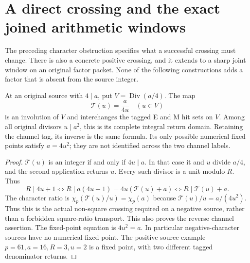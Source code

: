 \section{A direct crossing and the exact joined arithmetic windows}\label{sec:windows}
The preceding character obstruction specifies what a successful crossing must
change. There is also a concrete positive crossing, and it extends to a sharp
joint window on an original factor packet. None of the following constructions
adds a factor that is absent from the source integer.

\begin{theorem}\label{thm:quarter}
At an original source with $4\mid a$, put $V=\operatorname{Div}(a/4)$. The map
\[
 \mathcal T(u)=\frac a{4u}\quad(u\in V)                         \tag{W1}
\]
is an involution of $V$ and interchanges the tagged E and M hit sets on $V$.
Among all original divisors $u\mid a^2$, this is its complete integral return
domain. Retaining the channel tag, its inverse is the same formula. Its only
possible numerical fixed points satisfy $a=4u^2$; they are not identified across
the two channel labels.
\end{theorem}
\begin{proof}
$\mathcal T(u)$ is an integer if and only if $4u\mid a$. In that case it and $u$
divide $a/4$, and the second application returns $u$. Every such divisor is a
unit modulo $R$. Thus
\[
 R\mid4u+1\iff R\mid a(4u+1)=4u(\mathcal T(u)+a)
 \iff R\mid\mathcal T(u)+a.
\]
The character ratio is $\chi_p(\mathcal T(u)/u)=\chi_p(a)$ because
$\mathcal T(u)/u=a/(4u^2)$. Thus this is the actual non-square crossing
required on a negative source, rather than a forbidden square-ratio transport.
This also proves the reverse channel assertion. The fixed-point equation is
$4u^2=a$. In particular negative-character sources have no numerical fixed
point. The positive-source example $p=61,a=16,R=3,u=2$ is a fixed point, with
two different tagged denominator returns.
\end{proof}

